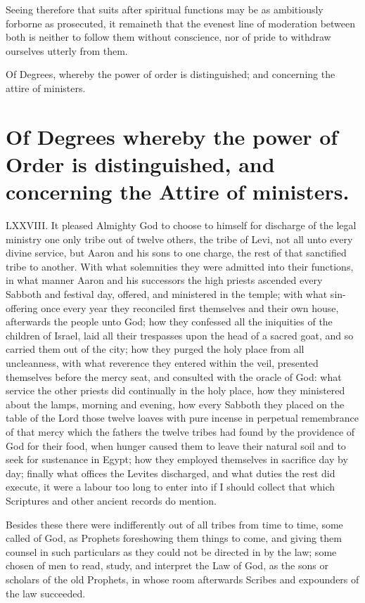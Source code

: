 Seeing therefore that suits after spiritual functions may be as ambitiously forborne as prosecuted, it remaineth that the evenest line of moderation between both is neither to follow them without conscience, nor of pride to withdraw ourselves utterly from them.


Of Degrees, whereby the power of order is distinguished; and concerning the attire of ministers.
\section*{Of Degrees whereby the power of Order is distinguished, and concerning the Attire of ministers.}
LXXVIII. It pleased Almighty God to choose to himself for discharge of the legal ministry one only tribe out of twelve others, the tribe of Levi, not all unto every divine service, but Aaron and his sons to one charge, the rest of that sanctified tribe to another. With what solemnities they were admitted into their functions, in what manner Aaron and his successors the high priests ascended every Sabboth and festival day, offered, and ministered in the temple; with what sin-offering once every year they reconciled first themselves and their own house, afterwards the people unto God; how they confessed all the iniquities of the children of Israel, laid all their trespasses upon the head of a sacred goat, and so carried them out of the city; how they purged the holy place from all uncleanness, with what reverence they entered within the veil, presented themselves before the mercy seat, and consulted with the oracle of God: what service the other priests did continually in the holy place, how they ministered about the lamps, morning and evening, how every Sabboth they placed on the table of the Lord those twelve loaves with pure incense in perpetual remembrance of that mercy which the fathers the twelve tribes had found by the providence of God for their food, when hunger caused them to leave their natural soil and to seek for sustenance in Egypt; how they employed themselves in sacrifice day by day; finally what offices the Levites discharged, and what duties the rest did execute, it were a  labour too long to enter into if I should collect that which Scriptures and other ancient records do mention.

Besides these there were indifferently out of all tribes from time to time, some called of God, as Prophets foreshowing them things to come, and giving them counsel in such particulars as they could not be directed in by the law; some chosen of men to read, study, and interpret the Law of God, as the sons or scholars of the old Prophets, in whose room afterwards Scribes and expounders of the law succeeded.

